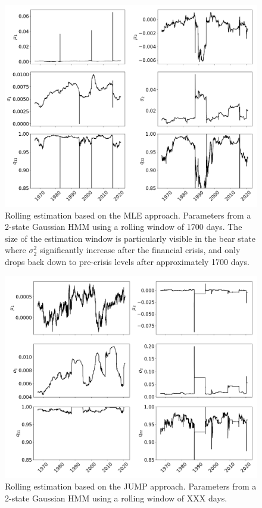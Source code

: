 \begin{figure}[H] 
    \centering
    \includegraphics[width=1.0\textwidth]{analysis/stylized_facts/images/2-state MLE HMM rolling params.png}
    \caption{Rolling estimation based on the MLE approach. Parameters from a 2-state Gaussian HMM using a rolling window of 1700 days. The size of the estimation window is particularly visible in the bear state where $\sigma_2^2$ significantly increase after the financial crisis, and only drops back down to pre-crisis levels after approximately 1700 days.}
    \label{fig: MLE estimation rolling parameters} 
\end{figure}

\begin{figure}[H] 
    \centering
    \includegraphics[width=1.0\textwidth]{analysis/stylized_facts/images/2-state JUMP HMM rolling params.png}
    \caption{Rolling estimation based on the JUMP approach. Parameters from a 2-state Gaussian HMM using a rolling window of XXX days.}
    \label{fig: Jump estimation rolling parameters} 
\end{figure}

